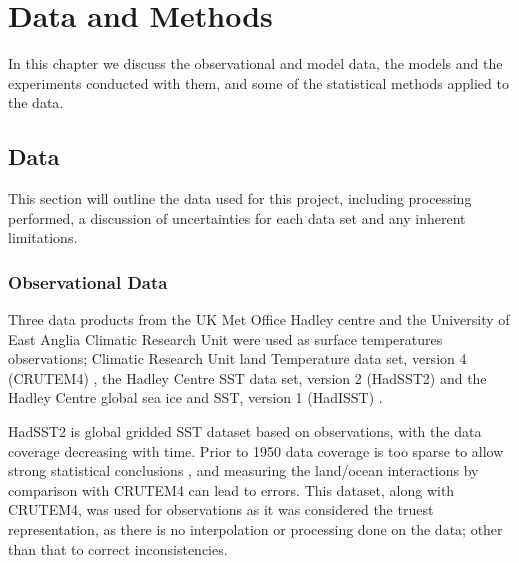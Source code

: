 \chapter{Data and Methods} %

\label{methods} %


In this chapter we discuss the observational and model data, the models and the 
experiments conducted with them, and some of the statistical methods applied to 
the data.


\section{Data}

This section will outline the data used for this project, including processing 
performed, a discussion of uncertainties for each data set and any inherent 
limitations.

\subsection{Observational Data}

Three data products from the UK Met Office Hadley centre and the University of 
East Anglia Climatic Research Unit were used as surface temperatures 
observations; Climatic Research Unit land Temperature data set, version 
4 (CRUTEM4) \citep{Brohan2006}, the Hadley Centre SST data set,
version 2 (HadSST2) \citep{Rayner2006} and the Hadley Centre global sea ice and 
SST, version 1 (HadISST) \citep{Rayner2003}. 

HadSST2 is global gridded SST dataset based on observations, with the data 
coverage decreasing with time. Prior to 1950 data coverage is too sparse to 
allow strong statistical conclusions \citep{Dommenget2009}, and measuring the 
land/ocean interactions by comparison with CRUTEM4 can lead to errors. This 
dataset, along with CRUTEM4, was used for observations as it was considered the 
truest representation, as there is no interpolation or processing done on the 
data; other than that to correct inconsistencies.

